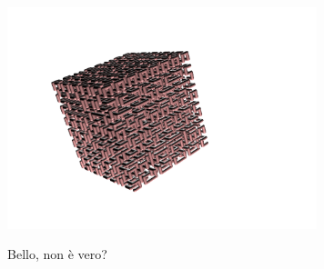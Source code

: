 \begin{center}
\begin{minipage}{7cm}
		\includegraphics[width=9cm]{pics/linden-hilbert4.png}
	\end{minipage}
\end{center}
Bello, non è vero?